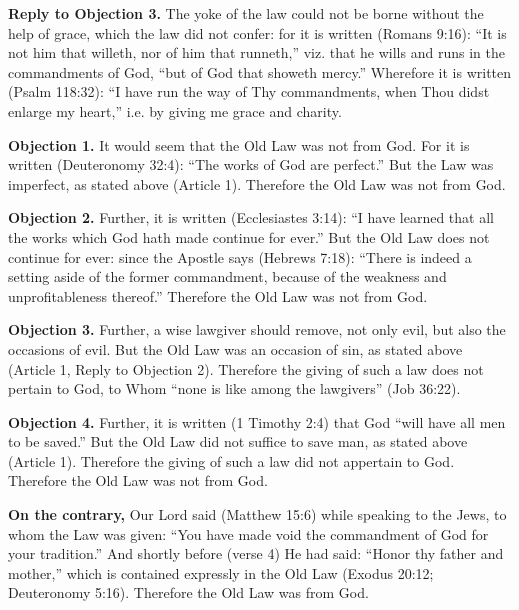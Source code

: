\textbf{Reply to Objection 3.} The yoke of the law could not be borne without the help of grace, which the law did not confer: for it is written (Romans 9:16): ``It is not him that willeth, nor of him that runneth,'' viz. that he wills and runs in the commandments of God, ``but of God that showeth mercy.'' Wherefore it is written (Psalm 118:32): ``I have run the way of Thy commandments, when Thou didst enlarge my heart,'' i.e. by giving me grace and charity.


\textbf{Objection 1.} It would seem that the Old Law was not from God. For it is written (Deuteronomy 32:4): ``The works of God are perfect.'' But the Law was imperfect, as stated above (Article 1). Therefore the Old Law was not from God.

\textbf{Objection 2.} Further, it is written (Ecclesiastes 3:14): ``I have learned that all the works which God hath made continue for ever.'' But the Old Law does not continue for ever: since the Apostle says (Hebrews 7:18): ``There is indeed a setting aside of the former commandment, because of the weakness and unprofitableness thereof.'' Therefore the Old Law was not from God.

\textbf{Objection 3.} Further, a wise lawgiver should remove, not only evil, but also the occasions of evil. But the Old Law was an occasion of sin, as stated above (Article 1, Reply to Objection 2). Therefore the giving of such a law does not pertain to God, to Whom ``none is like among the lawgivers'' (Job 36:22).

\textbf{Objection 4.} Further, it is written (1 Timothy 2:4) that God ``will have all men to be saved.'' But the Old Law did not suffice to save man, as stated above (Article 1). Therefore the giving of such a law did not appertain to God. Therefore the Old Law was not from God.

\textbf{On the contrary,} Our Lord said (Matthew 15:6) while speaking to the Jews, to whom the Law was given: ``You have made void the commandment of God for your tradition.'' And shortly before (verse 4) He had said: ``Honor thy father and mother,'' which is contained expressly in the Old Law (Exodus 20:12; Deuteronomy 5:16). Therefore the Old Law was from God.


